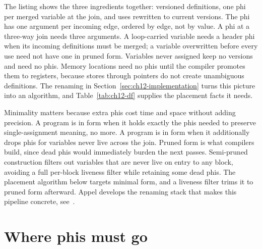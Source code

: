 The listing shows the three ingredients together: versioned definitions, one phi per merged variable at the join, and uses rewritten to current versions.
The phi has one argument per incoming edge, ordered by edge, not by value.
A phi at a three-way join needs three arguments.
A loop-carried variable needs a header phi when its incoming definitions must be merged; a variable overwritten before every use need not have one in pruned form.
Variables never assigned keep no versions and need no phis.
Memory locations need no phis until the compiler promotes them to registers, because stores through pointers do not create unambiguous definitions.
The renaming in Section~\ref{sec:ch12-implementation} turns this picture into an algorithm, and Table~\ref{tab:ch12-df} supplies the placement facts it needs.

Minimality matters because extra phis cost time and space without adding precision.
A program is in  form when it holds exactly the phis needed to preserve single-assignment meaning, no more.
A program is in  form when it additionally drops phis for variables never live across the join.
Pruned form is what compilers build, since dead phis would immediately burden the next passes.
Semi-pruned construction filters out variables that are never live on entry to any block, avoiding a full per-block liveness filter while retaining some dead phis.
The placement algorithm below targets minimal form, and a liveness filter trims it to pruned form afterward.
Appel develops the renaming stack that makes this pipeline concrete, see~\cite{appel-1998-modern}.

\section{Where phis must go}
\label{sec:ch12-placement}

